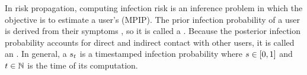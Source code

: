 \newcommand{\eventspace}{\Omega}
\newcommand{\event}{\omega}
\newcommand{\topk}[1]{\text{top } K \text{ of } #1}
\newcommand{\scores}[2]{R_{#1}^{(#2)}}
\newcommand{\diff}[1]{\delta_{#1}}

In risk propagation, computing infection risk is an inference problem in which the objective is to estimate a user's  (MPIP). The prior infection probability of a user is derived from their symptoms \cite{Menni2020}, so it is called a . Because the posterior infection probability accounts for direct and indirect contact with other users\footnotemark{}, it is called an . In general, a  $s_t$ is a timestamped infection probability where $s \in [0, 1]$ and $t \in \mathbb{N}$ is the time of its computation.


